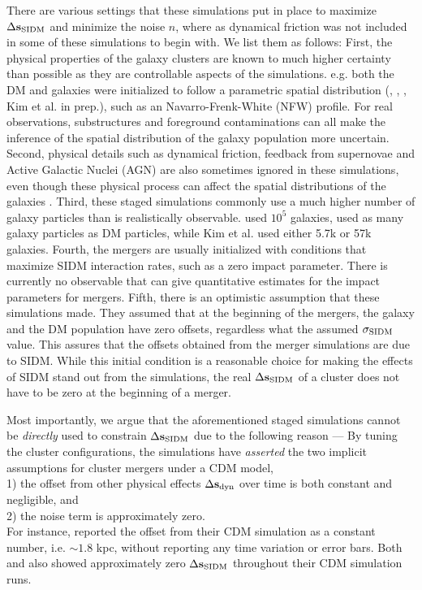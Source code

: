 There are various settings that these simulations put in place to maximize
$\Delta {\bf s}_{{\rm SIDM}}$ and minimize the noise $n$, where as  
dynamical friction was not included in some of these
simulations to begin with. 
We list them as follows: 
First, the physical properties of the galaxy
clusters are known to much higher certainty than possible as they are
controllable aspects of the simulations. e.g. both the DM and 
galaxies were initialized to follow a parametric spatial 
distribution   
(\citealt{Randall2008d}, \citealt{Kahlhoefer14}, \citealt{Robertson2016}, Kim
et al. in prep.), 
such as an Navarro-Frenk-White (NFW) profile. For real observations,
substructures and foreground
contaminations can all make the inference of the spatial distribution 
of the galaxy population more uncertain. 
Second, physical details such as dynamical friction, feedback from supernovae and Active
Galactic Nuclei (AGN) are also sometimes ignored in these simulations, 
even though these physical process can affect the spatial distributions of the
galaxies \citep{Cui2015}.  
Third, these staged simulations commonly use a much higher number of 
galaxy particles than is realistically observable. \cite{Randall2008d} used
$10^5$ galaxies, \cite{Kahlhoefer14} used as many galaxy particles as DM particles, 
while Kim et al. used either 5.7k or 57k galaxies. 
Fourth, the mergers are usually initialized with conditions that maximize SIDM
interaction rates, such as a zero impact parameter. There is currently no observable that
can give quantitative estimates for the impact parameters for mergers. 
Fifth, there is an optimistic assumption that these simulations made.
They assumed that at the beginning of the mergers, the galaxy and the DM
population have zero offsets, regardless what the assumed $\sigma_{\rm SIDM}$ value. 
This assures that the offsets obtained from the merger simulations are due to SIDM. 
While this initial condition 
is a reasonable choice for making the effects of SIDM stand out from the simulations, 
the real $\Delta {\bf s}_{{\rm SIDM}}$ of a cluster does not have to be zero at the beginning of a merger.  

Most importantly, we argue that the aforementioned staged simulations cannot be
{\it directly}
used to constrain $\Delta {\bf s}_{{\rm SIDM}}$ due to the following reason --- 
By tuning the cluster configurations, the simulations have {\it asserted}
the two implicit assumptions for cluster mergers under a CDM model, \\
1) the offset from other physical effects $\Delta {\bf s}_{\rm dyn}$ over time 
is both constant and negligible, 
and \\ 
2) the noise term is approximately zero.\\ 
For instance, \cite{Randall2008d} reported the offset from their CDM simulation 
as a constant number, i.e. $\sim 1.8$ kpc, without reporting any time variation or error bars. 
Both \cite{Robertson2016} and
\cite{Kahlhoefer14} also showed approximately zero $\Delta {\bf s}_{{\rm SIDM}}$ throughout their CDM 
simulation runs. 

